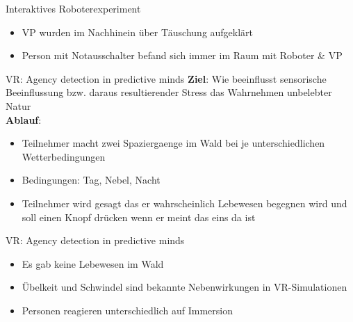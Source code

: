 \documentclass[10pt]{beamer}
\begin{document}
	\begin{frame}{Interaktives Roboterexperiment}

		\begin{itemize}
			\item VP wurden im Nachhinein über Täuschung aufgeklärt
			\item Person mit Notausschalter befand sich immer im Raum mit Roboter \& VP
		\end{itemize}
	\end{frame}
	
	\begin{frame}{VR: Agency detection in predictive minds}
		\textbf{Ziel}: Wie beeinflusst sensorische Beeinflussung bzw. daraus resultierender Stress das Wahrnehmen unbelebter Natur \\
		\textbf{Ablauf}:
		\begin{itemize}
		\item Teilnehmer macht zwei Spaziergaenge im Wald bei je unterschiedlichen Wetterbedingungen
		\item Bedingungen: Tag, Nebel, Nacht
		\item Teilnehmer wird gesagt das er wahrscheinlich Lebewesen begegnen wird und soll einen Knopf drücken wenn er meint das eins da ist
		\end{itemize}
	\end{frame}
	
	
	\begin{frame}{VR: Agency detection in predictive minds}
		
		\begin{itemize}
			\item Es gab keine Lebewesen im Wald
			\item Übelkeit und Schwindel sind bekannte Nebenwirkungen in VR-Simulationen
			\item Personen reagieren unterschiedlich auf Immersion
		\end{itemize}
		
	\end{frame}

\end{document}
